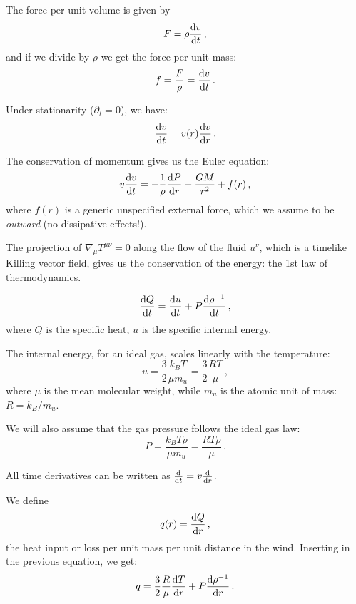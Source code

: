 \documentclass[main.tex]{subfiles}
\begin{document}
The force per unit volume is given by 
%
\begin{equation}
  F = \rho \dv{v}{t} 
\,,
\end{equation}
%
and if we divide by \(\rho \) we get the force per unit mass: 
%
\begin{equation}
  f = \frac{F}{\rho } = \dv{v}{t}  
\,.
\end{equation}

Under stationarity (\(\partial_t = 0\)), we have: 
%
\begin{equation}
  \dv{v}{t} = v(r) \dv{v}{r} 
\,.
\end{equation}
%

The conservation of momentum gives us the Euler equation: 
%
\begin{equation}
  v \dv{v}{t} = - \frac{1}{\rho } \dv{P}{r} - \frac{GM}{r^2} + f(r)
\,,
\end{equation}
%
where \(f(r)\) is a generic unspecified external force, which we assume to be \emph{outward} (no dissipative effects!).

\begin{bluebox}
    The projection of \(\nabla_{\mu }T^{\mu \nu }= 0\) along the flow of the fluid \(u^{\nu }\), which is a timelike Killing vector field, gives us the conservation of the energy: the 1st law of thermodynamics. 
\end{bluebox}

%
\begin{equation}
  \dv{Q}{t} = \dv{u}{t} + P \dv{\rho^{-1}}{t} 
\,,
\end{equation}
%
where \(Q\) is the specific heat, \(u \) is the specific internal energy.

The internal energy, for an ideal gas, scales linearly with the temperature: 
%
\begin{equation}
  u = \frac{3}{2} \frac{k_B T}{\mu m_u} = \frac{3}{2} \frac{R T}{\mu }
\,,
\end{equation}
%
where \(\mu \) is the mean molecular weight, while \(m_u\) is the atomic unit of mass: \(R = k_B / m_u\).

We will also assume that the gas pressure follows the ideal gas law: 
%
\begin{equation}
  P = \frac{k_B T \rho }{\mu m_u} = \frac{RT \rho }{\mu }
\,.
\end{equation}
%

All time derivatives can be written as \(\dv{}{t} = v \dv{}{r} \).

We define 
%
\begin{equation}
  q(r) = \dv{Q}{r} 
\,,
\end{equation}
%
the heat input or loss per unit mass per unit distance in the wind. Inserting in the previous equation, we get: 
%
\begin{equation}
  q = \frac{3}{2} \frac{R}{\mu } \dv{T}{r} + P \dv{\rho^{-1}}{r} 
\,.
\end{equation}
\end{document}
